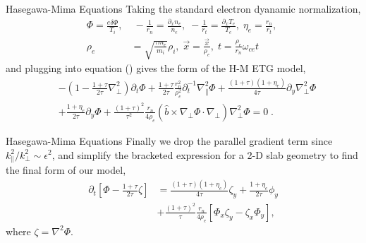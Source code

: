 \documentclass[aspectratio=43]{beamer}
\begin{document}
   \begin{frame}{Hasegawa-Mima Equations}
      \quad Taking the standard electron dyanamic normalization,
      \begin{equation}
      \begin{aligned}
         \Phi    = \frac{e\delta\Phi}{T_i},&\; -\frac{1}{r_n}=\frac{\partial_x n_e}{n_e},\; -\frac{1}{r_t}=\frac{\partial_x T_e}{T_e},\; \eta_e=\frac{r_n}{r_t},\; \\
         \rho_e &= \sqrt{\frac{\tau m_e}{m_i}}\rho_i,\; \vec{x} = \frac{\vec{x}}{\rho_e},\; t=\frac{\rho_e}{r_n}\omega_{ce}t
      \end{aligned}
      \end{equation}
   and plugging into equation () gives the form of the H-M ETG model,
      \begin{equation}
      \begin{aligned}
         &-(1-\frac{1+\tau}{2\tau}\nabla_{\perp}^2)\partial_t\Phi + \frac{1+\tau}{2\tau}\frac{r_n^2}{\rho_e^2}\partial_t^{-1}\nabla_{\parallel}^2\Phi
          + \frac{(1+\tau)(1+\eta_e)}{4\tau}\partial_y\nabla_{\perp}^2\Phi \\
         &+ \frac{1+\eta_e}{2\tau}\partial_y\Phi + \frac{(1+\tau)^2}{\tau^2}\frac{r_n}{4\rho_e}(\hat{b}\times\nabla_{\perp}\Phi\cdot\nabla_{\perp})\nabla_{\perp}^2\Phi = 0\;.
      \end{aligned}
      \end{equation}
   \end{frame}

   \begin{frame}{Hasegawa-Mima Equations}
      \quad Finally we drop the parallel gradient term since $k_{\parallel}^2/k_{\perp}^2 \sim \epsilon^2$, and simplify the bracketed expression for a 2-D slab geometry to find the final
   form of our model,
      \begin{equation}
      \begin{aligned}
         \partial_t[\Phi-\frac{1+\tau}{2\tau}\zeta] &= \frac{(1+\tau)(1+\eta_e)}{4\tau}\zeta_y + \frac{1+\eta_e}{2\tau}\phi_y \\
                                                    &+ \frac{(1+\tau)^2}{\tau}\frac{r_n}{4\rho_e}[\Phi_x\zeta_y-\zeta_x\Phi_y],
      \end{aligned}
      \end{equation}
   where $\zeta = \nabla^2\Phi$.
   \end{frame}
\end{document}
